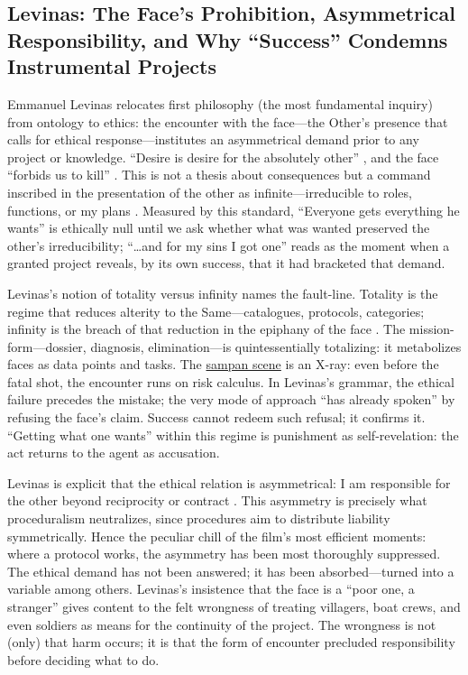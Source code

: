 \subsection*{Levinas: The Face's Prohibition, Asymmetrical Responsibility, and Why
	``Success'' Condemns Instrumental Projects}
\label{ssec:iii-levinas}
Emmanuel Levinas relocates first philosophy (the most fundamental inquiry) from ontology to
ethics: the encounter with the face—the Other's presence that calls for ethical
response—institutes an asymmetrical demand prior to any project or knowledge. ``Desire is desire
for the absolutely other'' \parencite[p.~33]{LevinasTI1969}, and the face ``forbids us to
kill'' \parencite[p.~199]{LevinasTI1969}. This is not a thesis about consequences but a command
inscribed in the presentation of the other as infinite—irreducible to roles, functions, or my
plans \parencite[pp.~194--201]{LevinasTI1969}. Measured by this standard, ``Everyone gets
everything he wants'' is ethically null until we ask whether what was wanted preserved the
other's irreducibility; ``\ldots and for my sins I got one'' reads as the moment when a granted
project reveals, by its own success, that it had bracketed that demand.

Levinas's notion of totality versus infinity names the fault-line. Totality is the regime that
reduces alterity to the Same—catalogues, protocols, categories; infinity is the breach of that
reduction in the epiphany of the face \parencite[pp.~21--24, 33--36]{LevinasTI1969}. The
mission-form—dossier, diagnosis, elimination—is quintessentially totalizing: it metabolizes
faces as data points and tasks. The \hyperref[scene:sampan]{sampan scene} is an X-ray: even
before the fatal shot, the encounter runs on risk calculus. In Levinas's grammar, the ethical
failure precedes the mistake; the very mode of approach ``has already spoken'' by refusing the
face's claim. Success cannot
redeem such refusal; it confirms it. ``Getting what one wants'' within this regime is punishment
as self-revelation: the act returns to the agent as accusation.

Levinas is explicit that the ethical relation is asymmetrical: I am responsible for the other
beyond reciprocity or contract \parencite[pp.~215--219]{LevinasTI1969}. This asymmetry is
precisely what proceduralism neutralizes, since procedures aim to distribute liability
symmetrically. Hence the peculiar chill of the film's most efficient moments: where a protocol
works, the asymmetry has been most thoroughly suppressed. The ethical demand has not been
answered; it has been absorbed—turned into a variable among others. Levinas's insistence that
the face is a ``poor one, a stranger'' \parencite[p.~213]{LevinasTI1969} gives content to the
felt wrongness of treating villagers, boat crews, and even soldiers as means for the continuity
of the project. The wrongness is not (only) that harm occurs; it is that the form of encounter
precluded responsibility before deciding what to do.

